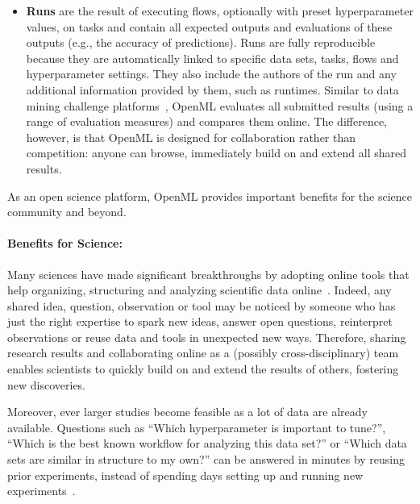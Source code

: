 \begin{itemize}
\item \textbf{Runs} are the result of executing flows, optionally with preset
hyperparameter values, on tasks and contain all expected outputs and evaluations
of these outputs (e.g., the accuracy of predictions).
Runs are fully reproducible because they are automatically linked to specific 
data sets, tasks, flows and hyperparameter settings.
They also include the authors of the run and any additional information provided 
by them, such as runtimes. 
Similar to data mining challenge platforms~\citep[e.g., Kaggle;][]{Carpenter:2011p34283}, OpenML evaluates all submitted results (using a range of evaluation measures) and
compares them online. The difference, however, is that
OpenML is designed for collaboration rather than competition: anyone can browse,
immediately build on and extend all shared results.
\end{itemize}

\noindent As an open science platform, OpenML provides important benefits for the science community and beyond.

\paragraph{Benefits for Science:}
Many sciences have made significant breakthroughs by adopting online tools that
help organizing, structuring and analyzing scientific data online~\citep{nielsen2012reinventing}.
Indeed, any shared idea, question, observation
or tool may be noticed by someone who has just the right expertise to
spark new ideas, answer open questions, reinterpret observations or reuse data
and tools in unexpected new ways. Therefore, sharing research results and 
collaborating online as a (possibly cross-disciplinary) team enables scientists
to quickly build on and extend the results of others, fostering new discoveries. 

Moreover, ever larger studies
become feasible as a lot of data are already available. %
Questions such as ``Which hyperparameter is important to tune?'', ``Which
is the best known workflow for analyzing this data set?'' or ``Which data sets are
similar in structure to my own?'' can be answered in minutes by
reusing prior experiments, instead of spending days setting up and running new
experiments~\citep{Vanschoren12}.


